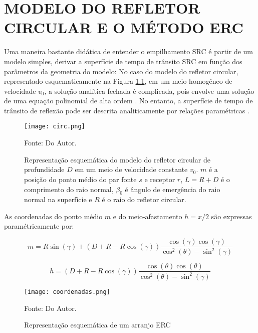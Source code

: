 \chapter{MODELO DO REFLETOR CIRCULAR E O MÉTODO ERC}
\label{cap7}

Uma maneira bastante didática de entender o empilhamento SRC é partir de um modelo simples,
derivar a superfície de tempo de trânsito SRC em função dos
parâmetros da geometria do modelo:
No caso do modelo do refletor circular,  representado esquematicamente na Figura \ref{fig:7.1}, 
em um meio homogêneo de velocidade $v_0$,
a solução analítica fechada é complicada, pois envolve uma solução de uma equação polinomial de
alta ordem \cite{landa}.
No entanto, a superfície de tempo de trânsito de reflexão pode ser descrita analiticamente por relações paramétricas
\cite{glaeser}.

\begin{figure}[htb]
\caption{Representação esquemática do modelo do refletor circular de profundidade $D$
em um meio de velocidade constante $v_0$.
$m$ é a posição do ponto médio do par fonte $s$ e receptor $r$, $L=R+D$ é o comprimento do raio normal, 
$\beta_0$ é ângulo de emergência
do raio normal na superfície e $R$ é o raio do refletor circular.}
\begin{flushleft}
\texttt{[image: circ.png]}
\vspace{-0.3cm}
\end{flushleft}
\begin{center}
 Fonte: Do Autor.
\end{center}
\label{fig:7.1}
\end{figure}



As coordenadas do ponto médio $m$ e do meio-afastamento $h=x/2$ 
são expressas paramétricamente por:

\begin{equation}
\label{eq:7.1}
 m=R\sin(\gamma)+(D+R-R\cos(\gamma))\frac{\cos(\gamma)\cos(\gamma)}{\cos^2(\theta)-\sin^2(\gamma)}
\end{equation}

\begin{equation}
\label{eq:7.2}
 h=(D+R-R\cos(\gamma))\frac{\cos(\theta)\cos(\theta)}{\cos^2(\theta)-\sin^2(\gamma)}
\end{equation}

\begin{figure}[htb]
\caption{Representação esquemática de um arranjo ERC }
\begin{center}
\texttt{[image: coordenadas.png]}
\vspace{-0.3cm}
\end{center}
\begin{center}
 Fonte: Do Autor.
\end{center}
\label{fig:7.2}
\end{figure}


